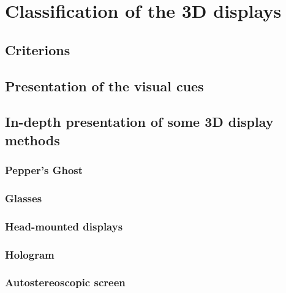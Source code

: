 \section{Classification of the 3D displays}
\subsection{Criterions}
\subsection{Presentation of the visual cues}
\subsection{In-depth presentation of some 3D display methods}
\subsubsection{Pepper's Ghost}
\subsubsection{Glasses}
\subsubsection{Head-mounted displays}
\subsubsection{Hologram}
\subsubsection{Autostereoscopic screen}
